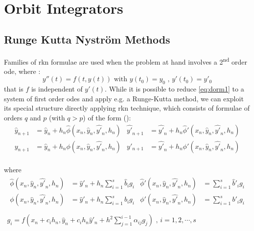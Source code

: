 \chapter{Orbit Integrators}
\label{ch:orbit-integrators}

\section{Runge Kutta Nystr{\"o}m Methods}
Families of \gls{rkn} formulae are used when the problem at hand involves 
a 2\textsuperscript{nd} order \gls{ode}, where :
\begin{equation}
  \label{eq:dorm1}
  y''(t) = f(t, y(t)) \text{ with } y(t_0) = y_0 \text{ , } y'(t_0) = y'_0
\end{equation}
that is \( f \) is independent of \( y'(t) \). While it is possible to reduce 
\ref{eq:dorm1} to a system of first order \glspl{ode} and apply e.g. a Runge-Kutta 
method, we can exploit its special structure directly applying \gls{rkn} technique,
which consists of formulae of orders \(q\) and \(p\) (with \(q>p\)) of the form 
(\cite{dormand87}):
\begin{equation}
  \begin{aligned}
    \hat{y}_{n+1}  & = \hat{y}_n + h_n \hat{\phi}(x_n , \hat{y}_n , \hat{y'}_n , h_n) & 
    \hat{y'}_{n+1} & = \hat{y'}_n + h_n \hat{\phi}' (x_n , \hat{y}_n , \hat{y'}_n , h_n) \\
    y_{n+1}        & = \hat{y}_n + h_n \phi (x_n , \hat{y}_n , \hat{y'}_n , h_n) & 
    y'_{n+1}       & = \hat{y'}_n + h_n {\phi}' (x_n , \hat{y}_n , \hat{y'}_n , h_n) \\
  \end{aligned}
\end{equation}

where
\begin{equation}
  \begin{aligned}
    \begin{aligned}
    \hat{\phi}(x_n , \hat{y}_n , \hat{y'}_n , h_n) & = \hat{y}'_n + h_n \sum_{i=1}^{s} \hat{b}_i g_i & 
    \hat{\phi}'(x_n , \hat{y}_n , \hat{y'}_n , h_n) & = \sum_{i=1}^{s} \hat{b}'_i g_i \\
         \phi (x_n , \hat{y}_n , \hat{y'}_n , h_n) & = \hat{y}'_n + h_n \sum_{i=1}^{s} b_i g_i & 
         {\phi}' (x_n , \hat{y}_n , \hat{y'}_n , h_n) & = \sum_{i=1}^{s} b'_i g_i \\
    \end{aligned}
    \\
    g_i = f(x_n + c_i h_n , \hat{y}_n +c_i h_n \hat{y}'_n + h^2 \sum_{j=1}^{i-1} {\alpha}_{ij}g_j) \text{ ,  } i=1,2,\cdots ,s\\
  \end{aligned}
\end{equation}

